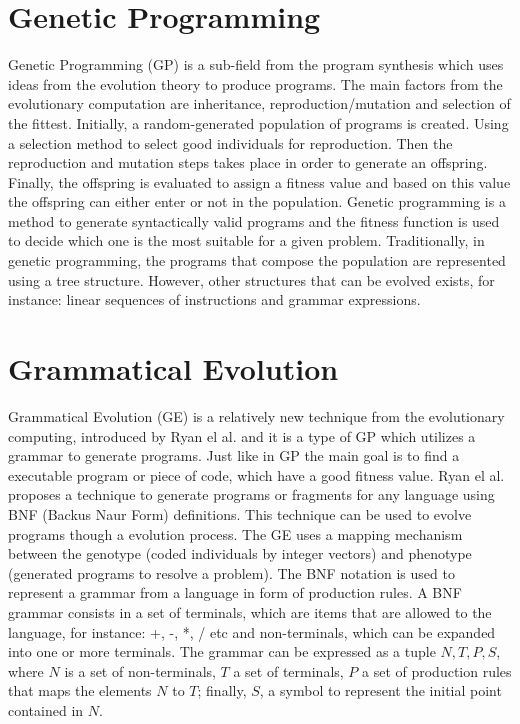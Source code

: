 \documentclass[conference]{IEEEtran}
\begin{document}
\section{Genetic Programming}

Genetic Programming (GP) \cite{burke2009exploring} is a sub-field from the program synthesis which uses ideas from the evolution theory to produce programs. The main factors from the evolutionary computation are inheritance, reproduction/mutation and selection of the fittest. Initially, a random-generated population of programs is created. Using a selection method to select good individuals for reproduction. Then the reproduction and mutation steps takes place in order to generate an offspring. Finally, the offspring is evaluated to assign a fitness value and based on this value the offspring can either enter or not in the population. Genetic programming is a method to generate syntactically valid programs and the fitness function is used to decide which one is the most suitable for a given problem. Traditionally, in genetic programming, the programs that compose the population are represented using a tree structure. However, other structures that can be evolved exists, for instance: linear sequences of instructions and grammar expressions. 

\section{Grammatical Evolution}
\label{sec:grammaticalEvolution}

Grammatical Evolution (GE) is a relatively new technique from the evolutionary computing, introduced by Ryan el al. \cite{ryan1998grammatical} and it is a type of GP which utilizes a grammar to generate programs. Just like in GP the main goal is to find a executable program or piece of code, which have a good fitness value. Ryan el al. \cite{ryan1998grammatical} proposes a technique to generate programs or fragments for any language using BNF (Backus Naur Form) definitions. This technique can be used to evolve programs though a evolution process. The GE uses a mapping mechanism between the genotype (coded individuals by integer vectors) and phenotype (generated programs to resolve a problem). The BNF notation is used to represent a grammar from a language in form of production rules. A BNF grammar consists in a set of terminals, which are items that are allowed to the language, for instance: +, -, *, / etc and non-terminals, which can be expanded into one or more terminals. The grammar can be expressed as a tuple ${N,T,P,S}$, where $N$ is a set of non-terminals, $T$ a set of terminals, $P$ a set of production rules that maps the elements $N$ to $T$; finally, $S$, a symbol to represent the initial point contained in $N$.
 
\end{document}
